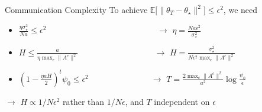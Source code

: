 \documentclass[aspectratio=169,14pt]{beamer}
\begin{document}
\begin{frame}{Communication Complexity}
  To achieve $\mathbb{E} \Big[ \| {\theta_T - \theta_\star} \|^2 \Big] \le \epsilon^2$, we need
  \begin{itemize}
  \item $\frac{\eta \sigma_\star^2}{N a} \le \epsilon^2$ ~~~~~~\,~~~~~~~~~~~~~~~~~~~ $\rightarrow$ $\eta = \frac{N a \epsilon^2}{\sigma_\star^2}$
  \item $H \le \frac{a}{\eta \max_c \| A^c \|^2}$ ~~~~~~~~~~~~~~~~~ $\rightarrow$ $H = \frac{ \sigma_\star^2 }{N \epsilon^2 \max_c \| A^c \|^2}$
  \item $(1 - \frac{\eta a H}{2})^{t} \psi_0 \le \epsilon^2$ ~~~~~~~~~~~~\,~~$\rightarrow$ $T = \frac{2 \max_c \| A^c \|^2}{a^2} \log \tfrac{\psi_0}{ \epsilon }$
  \end{itemize}

  $\rightarrow$ $H \propto 1/N\epsilon^2$ rather than $1/N\epsilon$, and $T$ independent on $\epsilon$


\end{frame}
\end{document}
